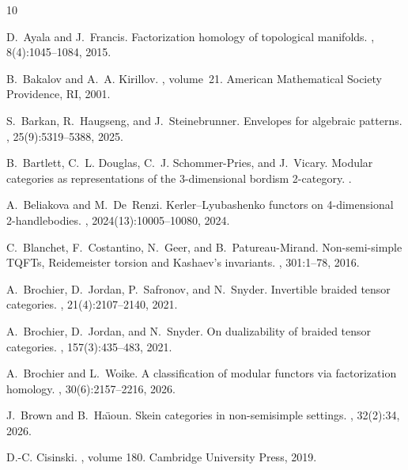 \documentclass[reqno]{amsart}
\theoremstyle{definition}
\renewcommand{\1}{\mathbf{1}}
\begin{document}
\begin{thebibliography}{10}

D.~Ayala and J.~Francis.
\newblock Factorization homology of topological manifolds.
, 8(4):1045--1084, 2015.

B.~Bakalov and A.~A. Kirillov.
, volume~21.
\newblock American Mathematical Society Providence, RI, 2001.

S.~Barkan, R.~Haugseng, and J.~Steinebrunner.
\newblock Envelopes for algebraic patterns.
, 25(9):5319--5388, 2025.

B.~Bartlett, C.~L. Douglas, C.~J. Schommer-Pries, and J.~Vicary.
\newblock Modular categories as representations of the 3-dimensional bordism
  2-category.
.

A.~Beliakova and M.~De~Renzi.
\newblock Kerler--{L}yubashenko functors on 4-dimensional 2-handlebodies.
, 2024(13):10005--10080, 2024.

C.~Blanchet, F.~Costantino, N.~Geer, and B.~Patureau-Mirand.
\newblock Non-semi-simple {TQFT}s, {R}eidemeister torsion and {K}ashaev's
  invariants.
, 301:1--78, 2016.

A.~Brochier, D.~Jordan, P.~Safronov, and N.~Snyder.
\newblock Invertible braided tensor categories.
, 21(4):2107--2140, 2021.

A.~Brochier, D.~Jordan, and N.~Snyder.
\newblock On dualizability of braided tensor categories.
, 157(3):435--483, 2021.

A.~Brochier and L.~Woike.
\newblock A classification of modular functors via factorization homology.
, 30(6):2157--2216, 2026.

J.~Brown and B.~Ha{\"\i}oun.
\newblock Skein categories in non-semisimple settings.
, 32(2):34, 2026.

D.-C. Cisinski.
, volume 180.
\newblock Cambridge University Press, 2019.


\end{thebibliography}
\end{document}
